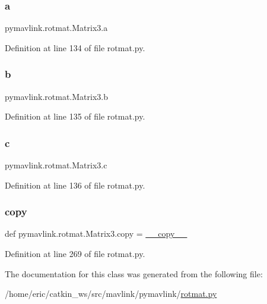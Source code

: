 \subsubsection{\texorpdfstring{a}{a}}
{\footnotesize\ttfamily pymavlink.\+rotmat.\+Matrix3.\+a}



Definition at line 134 of file rotmat.\+py.

\mbox{\label{classpymavlink_1_1rotmat_1_1Matrix3_a4bb23872122a20e4b5a6de2e2a327a2f}} 
\subsubsection{\texorpdfstring{b}{b}}
{\footnotesize\ttfamily pymavlink.\+rotmat.\+Matrix3.\+b}



Definition at line 135 of file rotmat.\+py.

\mbox{\label{classpymavlink_1_1rotmat_1_1Matrix3_aaad9f3e5cf235b0922738d71dc08e6b7}} 
\subsubsection{\texorpdfstring{c}{c}}
{\footnotesize\ttfamily pymavlink.\+rotmat.\+Matrix3.\+c}



Definition at line 136 of file rotmat.\+py.

\mbox{\label{classpymavlink_1_1rotmat_1_1Matrix3_a2766663f4736ceabdd5f39d98dcfef7f}} 
\subsubsection{\texorpdfstring{copy}{copy}}
{\footnotesize\ttfamily def pymavlink.\+rotmat.\+Matrix3.\+copy = \mbox{\hyperlink{classpymavlink_1_1rotmat_1_1Matrix3_aaab43e8d595d0c4422b5561db2a0b89f}{\+\_\+\+\_\+copy\+\_\+\+\_\+}}\hspace{0.3cm}{\ttfamily [static]}}



Definition at line 269 of file rotmat.\+py.



The documentation for this class was generated from the following file\+:\begin{DoxyCompactItemize}
\item 
/home/eric/catkin\+\_\+ws/src/mavlink/pymavlink/\mbox{\hyperlink{rotmat_8py}{rotmat.\+py}}\end{DoxyCompactItemize}
